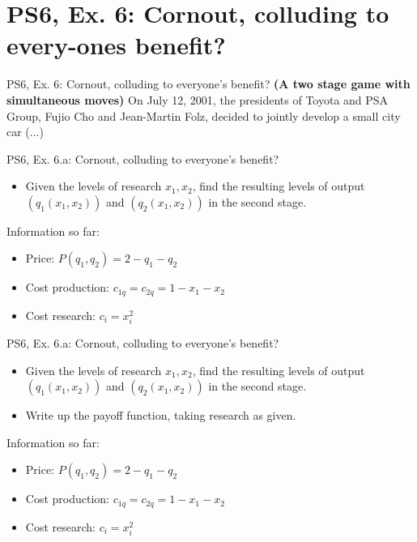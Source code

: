 \section{PS6, Ex. 6: Cornout, colluding to every-ones benefit?}

\begin{frame}{PS6, Ex. 6: Cornout, colluding to everyone's benefit?}
  \textbf{(A two stage game with simultaneous moves)} On July 12, 2001, the presidents of Toyota and PSA Group, Fujio Cho and Jean-Martin Folz, decided to jointly develop a small city car (...)
\end{frame}

\begin{frame}{PS6, Ex. 6.a: Cornout, colluding to everyone's benefit?}
    \begin{itemize}
    \item[(a)] Given the levels of research $x_1,x_2$, find the resulting levels of output $(q_1(x_1, x_2))$ and $(q_2(x_1, x_2))$ in the second stage.
    \end{itemize}
    \vfill\null
  \begin{multicols}{2}
    \vfill\null \columnbreak
    Information so far:
    \begin{itemize}
      \item[1] Price: $P(q_1,q_2)=2-q_1-q_2$
      \item[2] Cost production: $c_{1q} = c_{2q} = 1 - x_1 - x_2$
      \item[3] Cost research: $c_i=x_i^2$
    \end{itemize}
    \vfill\null
  \end{multicols}
\end{frame}
\begin{frame}{PS6, Ex. 6.a: Cornout, colluding to everyone's benefit?}
    \begin{itemize}
    \item[(a)] Given the levels of research $x_1,x_2$, find the resulting levels of output $(q_1(x_1, x_2))$ and $(q_2(x_1, x_2))$ in the second stage.
    \end{itemize}
    \vfill\null
  \begin{multicols}{2}
    \begin{itemize}
      \item[(Step 1)] Write up the payoff function, taking research as given.
    \end{itemize}
    \vfill\null \columnbreak
    Information so far:
    \begin{itemize}
      \item[1] Price: $P(q_1,q_2)=2-q_1-q_2$
      \item[2] Cost production: $c_{1q} = c_{2q} = 1 - x_1 - x_2$
      \item[3] Cost research: $c_i=x_i^2$
    \end{itemize}
    \vfill\null
  \end{multicols}
\end{frame}
